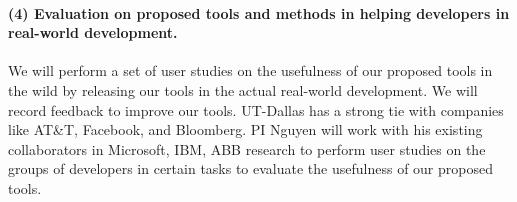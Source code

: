 \paragraph{\bf (4) Evaluation on proposed tools and methods in helping developers in real-world development.}

We will perform a set of user studies on the usefulness of our
proposed tools in the wild by releasing our
tools in the actual real-world development. 
We will record feedback to improve our tools.
UT-Dallas has a strong tie with companies like AT\&T, Facebook, and
Bloomberg. PI Nguyen will work with his existing collaborators in
Microsoft, IBM, ABB research to perform user studies on the groups of
developers in certain tasks to evaluate the usefulness of our proposed
tools.
